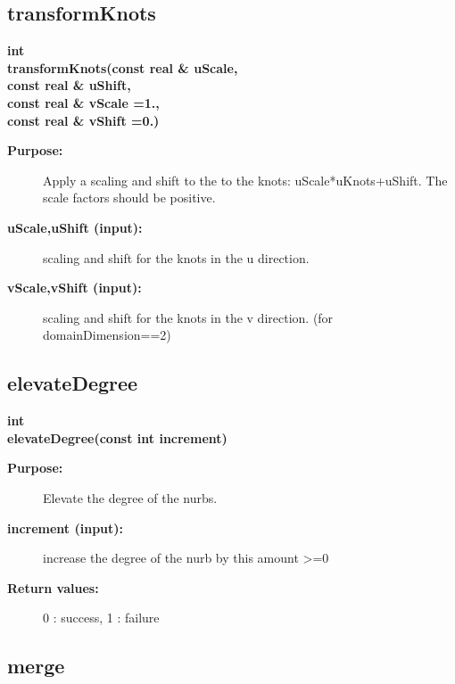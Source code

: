 \subsection{transformKnots}
 
\begin{flushleft} \textbf{%
int   \\ 
\settowidth{\NurbsMappingIncludeArgIndent}{transformKnots(}%
transformKnots(const real \& uScale, \\ 
\hspace{\NurbsMappingIncludeArgIndent}const real \& uShift,\\ 
\hspace{\NurbsMappingIncludeArgIndent}const real \& vScale  =1., \\ 
\hspace{\NurbsMappingIncludeArgIndent}const real \& vShift  =0.)
}\end{flushleft}
\begin{description}
\item[{\bf Purpose:}]  
    Apply a scaling and shift to the to the knots: uScale*uKnots+uShift.
 The scale factors should be positive.

\item[{\bf uScale,uShift (input):}]   scaling and shift for the knots in the u direction.
\item[{\bf vScale,vShift (input):}]  scaling and shift for the knots in the v direction.
     (for domainDimension==2)

\end{description}
\subsection{elevateDegree}
 
\begin{flushleft} \textbf{%
int  \\ 
\settowidth{\NurbsMappingIncludeArgIndent}{elevateDegree(}%
elevateDegree(const int increment)
}\end{flushleft}
\begin{description}
\item[{\bf Purpose:}]  
    Elevate the degree of the nurbs.
\item[{\bf increment (input):}]  increase the degree of the nurb by this amount >=0 
\item[{\bf Return values:}]  0 : success, 1 : failure
\end{description}
\subsection{merge}
 
